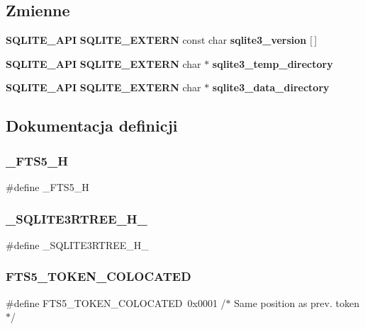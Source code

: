 \subsection*{Zmienne}
\begin{DoxyCompactItemize}
\item 
\textbf{ S\+Q\+L\+I\+T\+E\+\_\+\+A\+PI} \textbf{ S\+Q\+L\+I\+T\+E\+\_\+\+E\+X\+T\+E\+RN} const char \textbf{ sqlite3\+\_\+version} [$\,$]
\item 
\textbf{ S\+Q\+L\+I\+T\+E\+\_\+\+A\+PI} \textbf{ S\+Q\+L\+I\+T\+E\+\_\+\+E\+X\+T\+E\+RN} char $\ast$ \textbf{ sqlite3\+\_\+temp\+\_\+directory}
\item 
\textbf{ S\+Q\+L\+I\+T\+E\+\_\+\+A\+PI} \textbf{ S\+Q\+L\+I\+T\+E\+\_\+\+E\+X\+T\+E\+RN} char $\ast$ \textbf{ sqlite3\+\_\+data\+\_\+directory}
\end{DoxyCompactItemize}


\subsection{Dokumentacja definicji}
\mbox{\label{sqlite3_8h_aa2bad954856d186b3e84b27034429ae6}} 
\subsubsection{\_FTS5\_H}
{\footnotesize\ttfamily \#define \+\_\+\+F\+T\+S5\+\_\+H}

\mbox{\label{sqlite3_8h_a7ae19e0e2aee81373530a793ca663ebb}} 
\subsubsection{\_SQLITE3RTREE\_H\_}
{\footnotesize\ttfamily \#define \+\_\+\+S\+Q\+L\+I\+T\+E3\+R\+T\+R\+E\+E\+\_\+\+H\+\_\+}

\mbox{\label{sqlite3_8h_a447491a2af8fa00738a27f6eaf68d170}} 
\subsubsection{FTS5\_TOKEN\_COLOCATED}
{\footnotesize\ttfamily \#define F\+T\+S5\+\_\+\+T\+O\+K\+E\+N\+\_\+\+C\+O\+L\+O\+C\+A\+T\+ED~0x0001      /$\ast$ Same position as prev. token $\ast$/}

